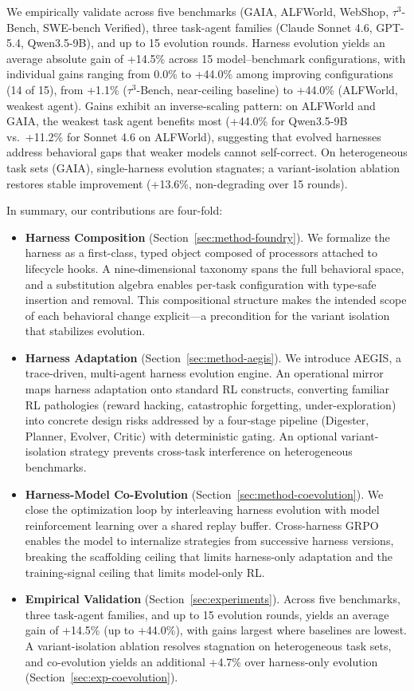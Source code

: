 We empirically validate \textbf{\ProjectName} across five benchmarks (GAIA, ALFWorld, WebShop, $\tau^3$-Bench, SWE-bench Verified), three task-agent families (Claude Sonnet 4.6, GPT-5.4, Qwen3.5-9B), and up to 15 evolution rounds. Harness evolution yields an average absolute gain of +14.5\% across 15 model--benchmark configurations, with individual gains ranging from 0.0\% to +44.0\% among improving configurations (14 of 15), from +1.1\% ($\tau^3$-Bench, near-ceiling baseline) to +44.0\% (ALFWorld, weakest agent). Gains exhibit an inverse-scaling pattern: on ALFWorld and GAIA, the weakest task agent benefits most (+44.0\% for Qwen3.5-9B vs.\ +11.2\% for Sonnet 4.6 on ALFWorld), suggesting that evolved harnesses address behavioral gaps that weaker models cannot self-correct. On heterogeneous task sets (GAIA), single-harness evolution stagnates; a variant-isolation ablation restores stable improvement (+13.6\%, non-degrading over 15 rounds).


In summary, our contributions are four-fold:
\begin{itemize}
  \item \textbf{Harness Composition} (Section~\ref{sec:method-foundry}). We formalize the harness as a first-class, typed object composed of processors attached to lifecycle hooks. A nine-dimensional taxonomy spans the full behavioral space, and a substitution algebra enables per-task configuration with type-safe insertion and removal. This compositional structure makes the intended scope of each behavioral change explicit---a precondition for the variant isolation that stabilizes evolution.
  \item \textbf{Harness Adaptation} (Section~\ref{sec:method-aegis}). We introduce AEGIS, a trace-driven, multi-agent harness evolution engine. An operational mirror maps harness adaptation onto standard RL constructs, converting familiar RL pathologies (reward hacking, catastrophic forgetting, under-exploration) into concrete design risks addressed by a four-stage pipeline (Digester, Planner, Evolver, Critic) with deterministic gating. An optional variant-isolation strategy prevents cross-task interference on heterogeneous benchmarks.
  \item \textbf{Harness-Model Co-Evolution} (Section~\ref{sec:method-coevolution}). We close the optimization loop by interleaving harness evolution with model reinforcement learning over a shared replay buffer. Cross-harness GRPO enables the model to internalize strategies from successive harness versions, breaking the scaffolding ceiling that limits harness-only adaptation and the training-signal ceiling that limits model-only RL.
  \item \textbf{Empirical Validation} (Section~\ref{sec:experiments}). Across five benchmarks, three task-agent families, and up to 15 evolution rounds, \ProjectName yields an average gain of +14.5\% (up to +44.0\%), with gains largest where baselines are lowest. A variant-isolation ablation resolves stagnation on heterogeneous task sets, and co-evolution yields an additional +4.7\% over harness-only evolution (Section~\ref{sec:exp-coevolution}).
\end{itemize}